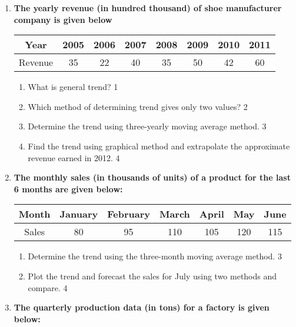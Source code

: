 \documentclass[a4paper,oneside]{book}
\begin{document}
  \begin{enumerate}

   \item
	  \textbf{The yearly revenue (in hundred thousand) of shoe manufacturer company is given below} 
  \begin{table}[h]
\centering
\begin{tabular}{cccccccc}
Year     & 2005 & 2006 & 2007 & 2008 & 2009 & 2010 & 2011 \\ \hline
Revenue & 35   & 22    & 40     & 35     & 50     & 42 & 60   
\end{tabular}
\end{table}
  
  \begin{enumerate}
    \item
	What is general trend? \hfill 1
    \item
	Which method of determining trend gives only two values? \hfill 2
    \item  
	Determine the trend using three-yearly moving average method. \hfill 3
    \item
	Find the trend using graphical method and extrapolate the approximate revenue earned in 2012. \hfill 4
  \end{enumerate}
  
  \item
\textbf{The monthly sales (in thousands of units) of a product for the last 6 months are given below:}

\begin{table}[h]
\centering
\begin{tabular}{ccccccc}
Month     & January & February & March & April & May & June \\ \hline
Sales     & 80      & 95       & 110   & 105   & 120  & 115  \\
\end{tabular}
\end{table}

\begin{enumerate}
\item
Determine the trend using the three-month moving average method. \hfill 3
\item
Plot the trend and forecast the sales for July using two methods 
and compare. \hfill 4
\end{enumerate}

\item
\textbf{The quarterly production data (in tons) for a factory is given below:}


\end{enumerate}
\end{document}
